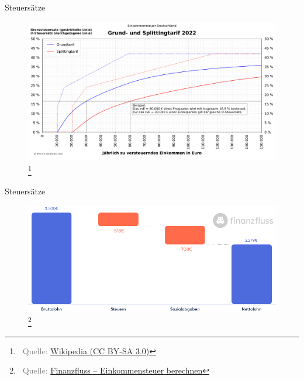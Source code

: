\documentclass{beamer}
\let\oldfootnote\footnote
\renewcommand{\footnote}[1]
{%
	\oldfootnote
	{
		\tiny
		\textcolor{gray}{\ #1}
	}%
}
\newcommand{\citeurl}[2]
{%
	\footnote{Quelle: \href{#1}{#2}}
}
\begin{document}
			\begin{frame}{Steuersätze}
				\begin{center}
					\vspace{-0.5cm}
					\begin{figure}
						\includegraphics[width=0.9\linewidth]{images/tarifzonen-diagramm}\citeurl{https://de.wikipedia.org/wiki/Datei:ESt_D_Splittingtarif_2022_zvE_bis_150000.svg}{Wikipedia (CC BY-SA 3.0)}
					\end{figure}
				\end{center}
			\end{frame}
		
			\begin{frame}{Steuersätze}
				\begin{center}
					\vspace{-0.5cm}
					\begin{figure}
						\includegraphics[width=0.8\linewidth]{images/steuerrechner}\citeurl{https://www.finanzfluss.de/rechner/einkommensteuer/}{Finanzfluss -- Einkommensteuer berechnen}
					\end{figure}
				\end{center}
			\end{frame}
			
\end{document}
